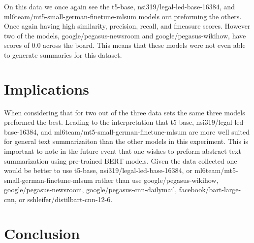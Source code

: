 \documentclass[twoside,twocolumn]{article}
\begin{document}
On this data we once again see the t5-base, nsi319/legal-led-base-16384, and ml6team/mt5-small-german-finetune-mlsum models out preforming the others. Once again having high similarity, precision, recall, and fmeasure scores. However two of the models, google/pegasus-newsroom and google/pegasus-wikihow, have scores of 0.0 across the board. This means that these models were not even able to generate summaries for this dataset.



\section{Implications}

When considering that for two out of the three data sets the same three models preformed the best. Leading to the interpretation that t5-base, nsi319/legal-led-base-16384, and ml6team/mt5-small-german-finetune-mlsum are more well suited for general text summarizaiton than the other models in this experiment. This is important to note in the future event that one wishes to preform abstract text summarization using pre-trained BERT models. Given the data collected one would be better to use t5-base, nsi319/legal-led-base-16384, or ml6team/mt5-small-german-finetune-mlsum rather than use google/pegasus-wikihow, google/pegasus-newsroom, google/pegasus-cnn-dailymail, facebook/bart-large-cnn, or sshleifer/distilbart-cnn-12-6.


\section{Conclusion}






\printbibliography

  

\end{document}
